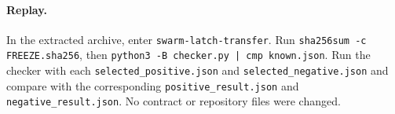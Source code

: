 \documentclass[11pt]{article}
\begin{document}
\paragraph{Replay.}
In the extracted archive, enter \texttt{swarm-latch-transfer}. Run \texttt{sha256sum -c FREEZE.sha256}, then \texttt{python3 -B checker.py | cmp known.json}. Run the checker with each \texttt{selected\_positive.json} and \texttt{selected\_negative.json} and compare with the corresponding \texttt{positive\_result.json} and \texttt{negative\_result.json}. No contract or repository files were changed.
\end{document}
